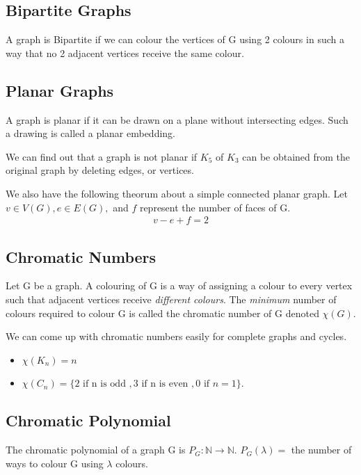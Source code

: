 \documentclass[12pt,letterpaper]{article} \usepackage{amsmath} \usepackage{graphicx}  \usepackage{longtable}  \usepackage{amssymb}
\begin{document}
        \subsection{Bipartite Graphs}
        A graph is Bipartite if we can colour the vertices of G using 2 colours in such a way that no 2 adjacent vertices receive the same colour. 

        \subsection{Planar Graphs}
        A graph is planar if it can be drawn on a plane without intersecting edges. Such a drawing is called a planar embedding. 

        We can find out that a graph is not planar if $K_5$ of $K_3$ can be obtained from the original graph by deleting edges, or vertices. 

        We also have the following theorum about a simple connected planar graph. Let $v\in V(G), e\in E(G), $ and $f$ represent the number of faces of G. 
        \begin{align*}
            v-e+f=2
        \end{align*}

        \subsection{Chromatic Numbers}
        Let G be a graph. A colouring of G is a way of assigning a colour to every vertex such that adjacent vertices receive \emph{different colours}. The \emph{minimum} number of colours required to colour G is called the chromatic number of G denoted $\chi (G)$.

        We can come up with chromatic numbers easily for complete graphs and cycles. 
        \begin{itemize}[noitemsep]
            \item $\chi(K_n) = n$
            \item $\chi(C_n) = \{2 \text{ if n is odd }, 3 \text{ if n is even }, 0 \text{ if } n=1\}$.
        \end{itemize}

        \subsection{Chromatic Polynomial}
        The chromatic polynomial of a graph G is $P_G : \mathbb{N} \rightarrow \mathbb{N}$. $P_G (\lambda) = $ the number of ways to colour G using $\lambda$ colours. 
\end{document}
